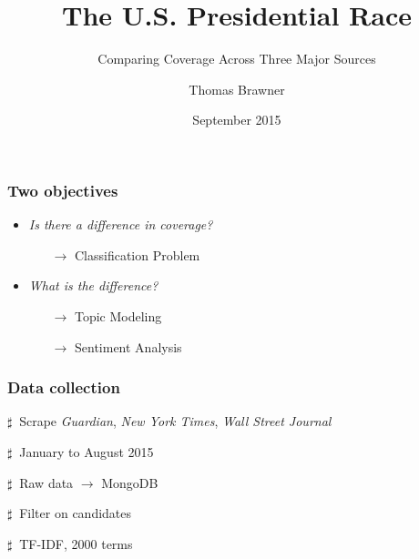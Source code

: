 \documentclass[11pt]{beamer}
\title{The U.S. Presidential Race}
\subtitle{Comparing Coverage Across Three Major Sources}
\author{Thomas Brawner}
\institute{\normalsize Galvanize, Inc.}
\date{September 2015}
\newenvironment{innerlist}[1][\enskip\textbullet]%
        {\begin{compactenum}[#1]}{\end{compactenum}}
\begin{document}
\maketitle


\begin{frame}
\frametitle{Two objectives}

\vspace{5mm}

\begin{itemize}
	\item {\it Is there a difference in coverage?} 
	\vspace{3mm}
	\begin{itemize}
		\item[$\rightarrow$] Classification Problem
	\end{itemize}
	\vspace{6mm}
	\item {\it What is the difference?}
	\vspace{3mm}
	\begin{itemize}
		\item[$\rightarrow$] Topic Modeling 
		\vspace{2mm}
		\item[$\rightarrow$] Sentiment Analysis 
	\end{itemize}
\end{itemize}

\end{frame}


\begin{frame}
\frametitle{Data collection}

\vspace{5mm}

\begin{innerlist}
	\item[$\sharp~$] Scrape {\it Guardian}, {\it New York Times}, {\it Wall Street Journal}
	\vspace{4mm}
	\item[$\sharp~$] January to August 2015
	\vspace{4mm}
	\item[$\sharp~$] Raw data $\rightarrow$ MongoDB
	\vspace{4mm}
	\item[$\sharp~$] Filter on candidates
	\vspace{4mm}
	\item[$\sharp~$] TF-IDF, 2000 terms
\end{innerlist}

\end{frame}
\end{document}
